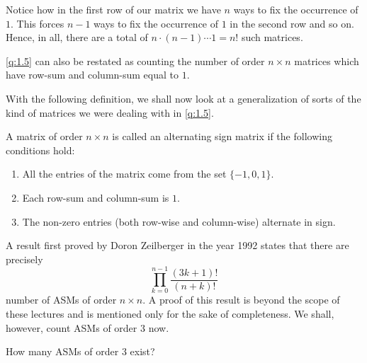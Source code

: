 \begin{solution}
Notice how in the first row of our matrix we have $n$ ways to fix the occurrence of $1$. This forces $n-1$ ways to fix the occurrence of $1$ in the second row and so on. Hence, in all, there are a total of $n\cdot \left( n-1 \right) \cdots 1 = n!$ such matrices.
\end{solution}
\begin{remark}
\cref{q:1.5} can also be restated as counting the number of order $n\times n$ matrices which have row-sum and column-sum equal to $1$.    
\end{remark}
With the following definition, we shall now look at a generalization of sorts of the kind of matrices we were dealing with in \cref{q:1.5}.
\begin{definition}
	A matrix of order $n\times n$ is called an alternating sign matrix if the following conditions hold:
	\begin{enumerate}
		\item All the entries of the matrix come from the set $\{-1,0,1\}$.
		\item Each row-sum and column-sum is $1$.
		\item The non-zero entries (both row-wise and column-wise) alternate in sign.
	\end{enumerate}
\end{definition}
A result first proved by Doron Zeilberger in the year 1992 states that there are precisely  \[
\prod_{k=0}^{n-1} \frac{\left( 3k+1 \right)!}{\left( n+k \right)!}
\] 
number of ASMs of order $n\times n$. A proof of this result is beyond the scope of these lectures and is mentioned only for the sake of completeness. We shall, however, count ASMs of order $3$ now.
\begin{question}
    How many ASMs of order $3$ exist?
    \label{q:1.6}
\end{question}
